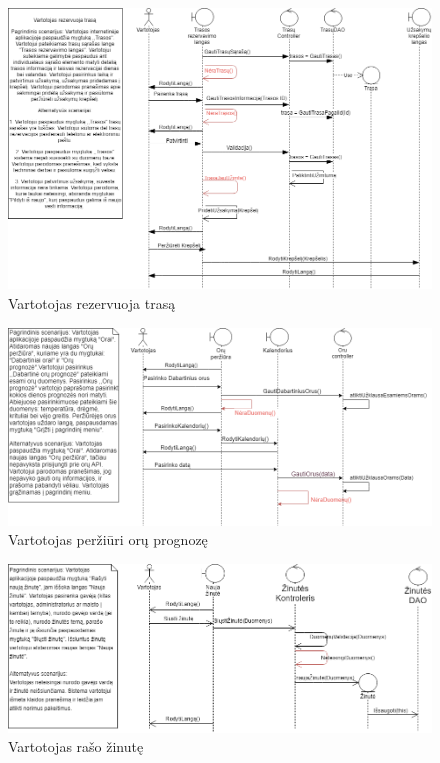 \documentclass[oneside]{VUMIFPSkursinis}
\begin{document}
			\begin{figure}[h]
    				\centering
    				\includegraphics[width=1\textwidth]{seq8.png}
    				\caption{Vartotojas rezervuoja trasą}
    				\label{fig:VartotojoUseCasel}
			\end{figure}

			\begin{figure}[h]
    				\centering
    				\includegraphics[width=1\textwidth]{seq10.png}
    				\caption{Vartotojas peržiūri orų prognozę}
    				\label{fig:Vartotojas peržiūri orų prognozę}
			\end{figure}

			\begin{figure}[h]
    				\centering
    				\includegraphics[width=1\textwidth]{seq11.png}
    				\caption{Vartotojas rašo žinutę}
    				\label{fig:Vartotojas rašo žinutę}
			\end{figure}
\end{document}
